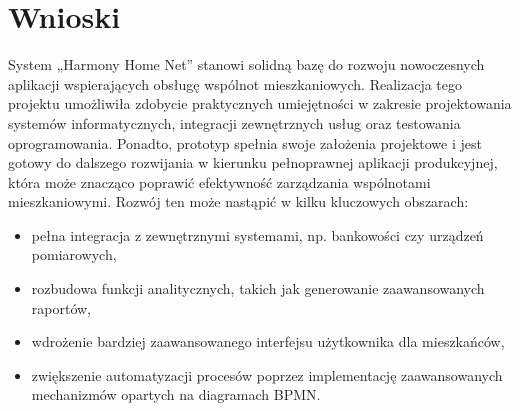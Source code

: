 \section{Wnioski}
System „Harmony Home Net” stanowi solidną bazę do rozwoju nowoczesnych aplikacji wspierających obsługę wspólnot mieszkaniowych. Realizacja tego projektu umożliwiła zdobycie praktycznych umiejętności w zakresie projektowania systemów informatycznych, integracji zewnętrznych usług oraz testowania oprogramowania. Ponadto, prototyp spełnia swoje założenia projektowe i jest gotowy do dalszego rozwijania w kierunku pełnoprawnej aplikacji produkcyjnej, która może znacząco poprawić efektywność zarządzania wspólnotami mieszkaniowymi. Rozwój ten może nastąpić w kilku kluczowych obszarach:
\begin{itemize}
    \item pełna integracja z zewnętrznymi systemami, np. bankowości czy urządzeń pomiarowych,
    \item rozbudowa funkcji analitycznych, takich jak generowanie zaawansowanych raportów,
    \item wdrożenie bardziej zaawansowanego interfejsu użytkownika dla mieszkańców,
    \item zwiększenie automatyzacji procesów poprzez implementację zaawansowanych mechanizmów opartych na diagramach BPMN.
\end{itemize}


